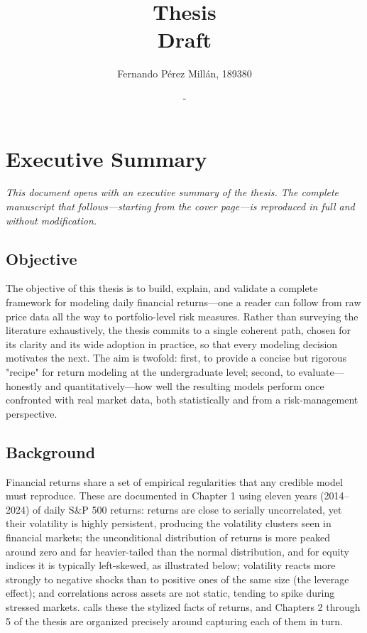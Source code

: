 \documentclass[11pt, oneside]{book}
\title{
    Thesis \\
    \large \textbf{Draft}
}
\author{
Fernando Pérez Millán, 189380}
\date{-}
\numberwithin{equation}{chapter}
\numberwithin{table}{chapter}
\begin{document}
\pagestyle{plain}
\frontmatter

\chapter*{Executive Summary}

{\small\textit{This document opens with an executive summary of the thesis. The complete manuscript that follows—starting from the cover page—is reproduced in full and without modification.}}

\section*{Objective}

The objective of this thesis is to build, explain, and validate a complete framework for modeling daily financial returns—one a reader can follow from raw price data all the way to portfolio-level risk measures. Rather than surveying the literature exhaustively, the thesis commits to a single coherent path, chosen for its clarity and its wide adoption in practice, so that every modeling decision motivates the next. The aim is twofold: first, to provide a concise but rigorous "recipe" for return modeling at the undergraduate level; second, to evaluate—honestly and quantitatively—how well the resulting models perform once confronted with real market data, both statistically and from a risk-management perspective.

\section*{Background}

Financial returns share a set of empirical regularities that any credible model must reproduce. These are documented in Chapter 1 using eleven years (2014--2024) of daily S\&P 500 returns: returns are close to serially uncorrelated, yet their volatility is highly persistent, producing the volatility clusters seen in financial markets; the unconditional distribution of returns is more peaked around zero and far heavier-tailed than the normal distribution, and for equity indices it is typically left-skewed, as illustrated below; volatility reacts more strongly to negative shocks than to positive ones of the same size (the leverage effect); and correlations across assets are not static, tending to spike during stressed markets.  calls these the stylized facts of returns, and Chapters 2 through 5 of the thesis are organized precisely around capturing each of them in turn.
\end{document}
